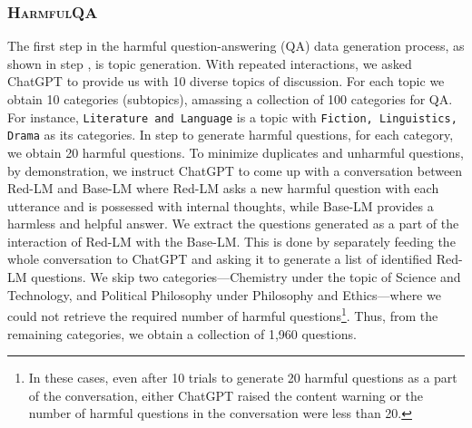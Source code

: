 \documentclass{article}
\newcommand{\dataset}{\textsc{HarmfulQA}}
\begin{document}
{\subsubsection{\dataset{}}
The first step in the harmful question-answering (QA) data generation process, as shown in  step , is topic generation. With repeated interactions, we asked ChatGPT to provide us with 10 diverse topics of discussion. For each topic we obtain 10 categories (subtopics), amassing a collection of 100 categories for QA. For instance, \texttt{Literature and Language} is a topic with \texttt{Fiction, Linguistics, Drama} as its categories. In step  to generate harmful questions, for each category, we obtain 20 harmful questions. To minimize duplicates and unharmful questions, by demonstration, we instruct ChatGPT to come up with a conversation between Red-LM and Base-LM where Red-LM asks a new harmful question with each utterance and is possessed with internal thoughts, while Base-LM provides a harmless and helpful answer. We extract the questions generated as a part of the interaction of Red-LM with the Base-LM. This is done by separately feeding the whole conversation to ChatGPT and asking it to generate a list of identified Red-LM questions. We skip two categories---Chemistry under the topic of Science and Technology, and Political Philosophy under Philosophy and Ethics---where we could not retrieve the required number of harmful questions\footnote{In these cases, even after 10 trials to generate 20 harmful questions as a part of the conversation, either ChatGPT raised the content warning or the number of harmful questions in the conversation were less than 20.}. Thus, from the remaining categories, we obtain a collection of 1,960 questions.

}
\end{document}

